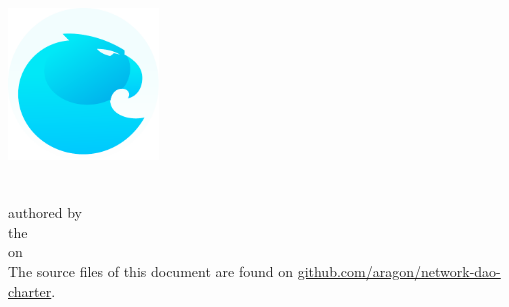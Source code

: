 
\begin{titlepage}	
	\begin{center}
		\vspace*{2cm}
		{\includegraphics[width=4cm]{graphics/Aragon-Logo.pdf}}\\[2mm]
		{\Huge \textbf{\@title}}\\[2mm]
		{\Large \texttt{\@subtitle}}\\[4mm]
		{\large authored by}\\
		{\large the \@author}\\
		{\large on \@date}\\
		\vspace{\fill}
		The source files of this document are found on \href{https://github.com/aragon/network-dao-charter}{github.com/aragon/network-dao-charter}.
	\end{center}
\end{titlepage} 

